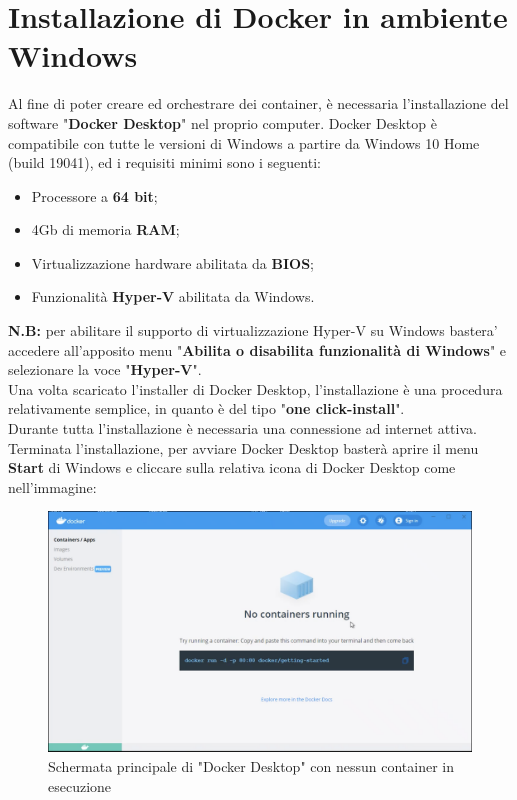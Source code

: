 \section{Installazione di Docker in ambiente Windows}
Al fine di poter creare ed orchestrare dei container, è necessaria l'installazione del software "\textbf{Docker Desktop}" nel proprio computer. Docker Desktop è compatibile con tutte le versioni di Windows a partire da Windows 10 Home (build 19041), ed i requisiti minimi sono i seguenti:
\begin{itemize}
	\item Processore a \textbf{64 bit};
	\item 4Gb di memoria \textbf{RAM};
	\item Virtualizzazione hardware abilitata da \textbf{\gls{BIOS}};
	\item Funzionalità \textbf{Hyper-V} abilitata da Windows.
\end{itemize}
\textbf{N.B:} per abilitare il supporto di virtualizzazione Hyper-V su Windows bastera' accedere all'apposito menu "\textbf{Abilita o disabilita funzionalità di Windows}" e selezionare la voce "\textbf{Hyper-V}".
\\
Una volta scaricato l'\gls{installer} di Docker Desktop, l'installazione è una procedura relativamente semplice, in quanto è del tipo "\textbf{one click-install}".\\
Durante tutta l'installazione è necessaria una connessione ad internet attiva.\\
Terminata l'installazione, per avviare Docker Desktop basterà aprire il menu \textbf{Start} di Windows e cliccare sulla relativa icona di Docker Desktop come nell'immagine:\\
\begin{figure}[!h]     
\centering 
    \includegraphics[width=1.0\columnwidth]{immagini/screenshot/docker_desktop_initialscreen} 
    \caption{Schermata principale di "Docker Desktop" con nessun container in esecuzione}
\end{figure} \\


